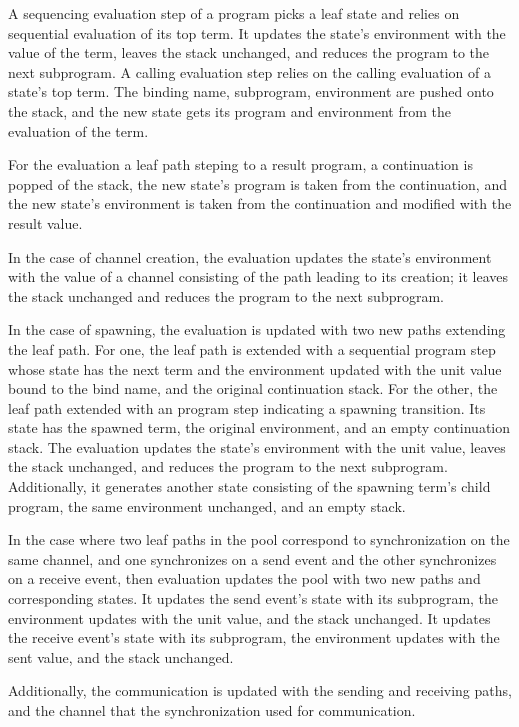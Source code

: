 \documentclass[10pt]{article}
\begin{document}
A sequencing evaluation step of a program picks a leaf state and relies on
sequential evaluation of its top term. It updates the state's environment with the
value of the term, leaves the stack unchanged, and reduces the program to the next
subprogram. A calling evaluation step relies on the calling evaluation of a state's top
term. The binding name, subprogram, environment are pushed onto the stack, and the new
state gets its program and environment from the evaluation of the term. 

For the evaluation a leaf path steping to a result program, a continuation is popped of the
stack, the new state's program is taken from the continuation, and the new state's environment
is taken from the continuation and modified with the result value.

In the case of channel creation, the evaluation updates the state's environment with the
value of a channel consisting of the path leading to its creation; it leaves the stack
unchanged and reduces the program to the next subprogram.

In the case of spawning, the evaluation is updated with two
new paths extending the leaf path.  For one, the leaf path is extended with a sequential
program step whose state has the next term and the environment updated
with the unit value bound to
the bind name, and the original continuation stack. For the other, the leaf path
extended with an program step indicating a spawning transition.  Its state has the spawned
term, the original environment, and an empty continuation stack. 
The evaluation updates the state's environment with the
unit value, leaves the stack unchanged, and reduces the program to the next subprogram.
Additionally, it generates another state consisting of the spawning term's child
program, the same environment unchanged, and an empty stack.

In the case where two leaf paths in the pool correspond to synchronization on the same channel,
and one synchronizes on a send event and the other synchronizes on a receive event, then
evaluation updates the pool with two new paths and corresponding states.
It updates the send event's state with its subprogram, the environment updates with the unit
value, and the stack unchanged.  It updates the receive event's state with its subprogram, the
environment updates with the sent value, and the stack unchanged.

Additionally, the communication is updated with the sending and receiving paths, and the channel
that the synchronization used for communication. 
\end{document}
